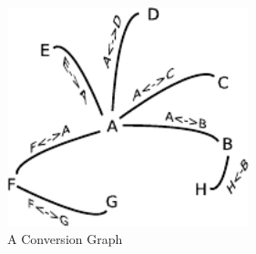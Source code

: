 \begin{figure}[h!]
\centering
\includegraphics[width=70mm]{../img/conversionGraph.pdf}
\caption{A Conversion Graph}
\label{fig:conversionGraph}
\end{figure}

\orgcishellserviceconversion{}